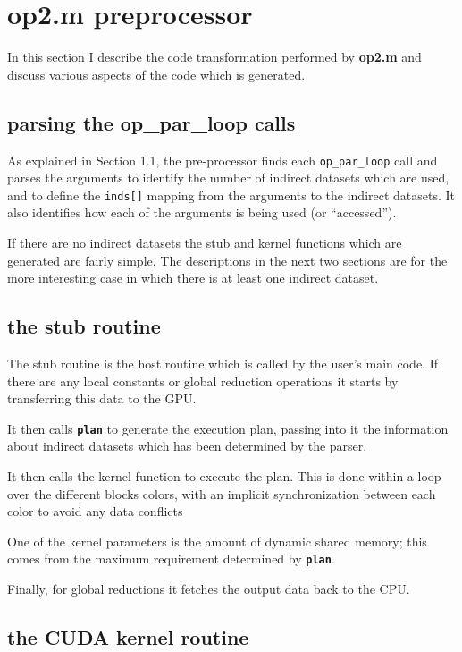 \documentclass[12pt]{article}
\begin{document}
\section{op2.m preprocessor}

In this section I describe the code transformation performed by
{\bf op2.m} and discuss various aspects of the code which is generated.

\subsection{parsing the op\_par\_loop calls}

As explained in Section 1.1, the pre-processor finds each 
{\tt op\_par\_loop} call 
and parses the arguments to identify the number of indirect 
datasets which are used, and to define the {\tt inds[]} mapping from 
the arguments to the indirect datasets.  It also identifies how
each of the arguments is being used (or ``accessed'').

If there are no indirect datasets the stub and kernel functions
which are generated are fairly simple.  The descriptions in the next 
two sections are for the more interesting case in which there is
at least one indirect dataset.

\subsection{the stub routine}

The stub routine is the host routine which is called by the user's 
main code.  If there are any local constants or global reduction 
operations it starts by transferring this data to the GPU.

It then calls {\tt \bf plan} to generate the execution plan, 
passing into it the information about indirect datasets which 
has been determined by the parser.

It then calls the kernel function to execute the plan.  This is 
done within a loop over the different blocks colors, with an
implicit synchronization between each color to avoid any data 
conflicts

One of the kernel parameters is the amount of dynamic shared 
memory; this comes from the maximum requirement determined 
by {\tt \bf plan}.

Finally, for global reductions it fetches the output data back
to the CPU.

\newpage

\subsection{the CUDA kernel routine}
\end{document}
